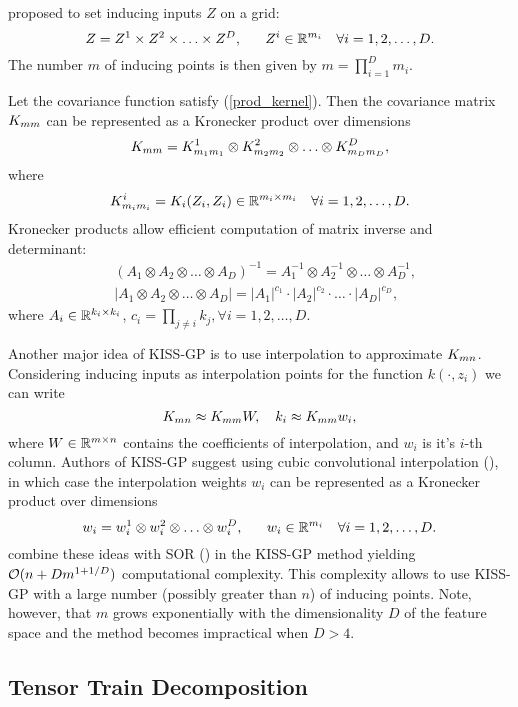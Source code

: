   \citet{wilson2015} proposed to set inducing inputs $Z$ on a grid:
  \[
    Z = Z^1 \times Z^2 \times \ldots \times Z^D,~~~~~Z^i \in \mathbb{R}^{m_i}~~~\forall i = 1, 2, \ldots, D.
  \]
  The number $m$ of inducing points is then given by $m = \prod_{i=1}^D m_{i}$.

  Let the covariance function satisfy (\ref{prod_kernel}). Then the covariance
  matrix $K_{mm}$ can be represented as a Kronecker product over dimensions
  \[
    K_{mm} = K_{m_1 m_1}^1 \otimes K^2_{m_2 m_2} \otimes \ldots \otimes
    K^D_{m_D m_D},
  \]
  where
  \[
    K^i_{m_i m_i} = K_i(Z_i, Z_i) \in \mathbb{R}^{m_i \times m_i}~~~\forall i = 1, 2, \ldots, D.
  \]
  Kronecker products allow efficient computation of matrix inverse and determinant:
  \begin{align*}
    &(A_1 \otimes A_2 \otimes \ldots \otimes A_D)^{-1} = A_1^{-1} \otimes A_2^{-1} \otimes \ldots \otimes A_D^{-1},\\
    &|A_1 \otimes A_2 \otimes \ldots \otimes A_D| = |A_1|^{c_1} \cdot |A_2|^{c_2} \cdot \ldots \cdot |A_D|^{c_D},
  \end{align*}
  where $A_i\in\mathbb{R}^{k_i \times k_i}$, $c_i = \prod_{j \ne i} k_j,\forall i = 1, 2, \ldots, D$.
  
  Another major idea of KISS-GP is to use interpolation to approximate $K_{mn}$.
  Considering inducing inputs as interpolation points for the function
  $k(\cdot, z_i)$ we can write
  \begin{equation}
  \label{kernel_interpolation}
    K_{mn} \approx K_{mm} W,~~~k_{i} \approx K_{mm} w_i,
  \end{equation}
  where $W \in \mathbb{R}^{m \times n}$ contains the coefficients of interpolation, and
  $w_i$ is it's $i$-th column. Authors of KISS-GP suggest using cubic
  convolutional interpolation (\citet{keys1981}), in which case the interpolation
  weights $w_i$ can be represented as a Kronecker product over dimensions
  \[
    w_i = w_i^1 \otimes w_i^2 \otimes \ldots \otimes w_i^D,~~~~~w_i \in \mathbb{R}^{m_i}~~~\forall i = 1, 2, \ldots, D.
  \]
  \citet{wilson2015} combine these ideas with SOR (\citet{silverman1985})
  in the KISS-GP method yielding $\mathcal{O}(n + D m^{1 + 1/D})$ computational
  complexity. This complexity allows to use KISS-GP with a large number (possibly
  greater than $n$) of inducing points. Note, however, that $m$ grows
  exponentially with the dimensionality $D$ of the feature space and the
  method becomes impractical when $D > 4$.

\subsection{Tensor Train Decomposition}
\label{tensor_train}

